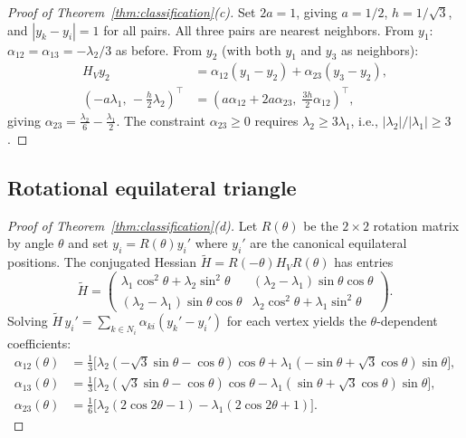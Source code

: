 \documentclass[11pt]{article}
\theoremstyle{plain}%
\theoremstyle{definition}%
\theoremstyle{definition}%
\theoremstyle{remark}%
\numberwithin{equation}{section}
\newcommand{\HV}{H_V}
\begin{document}
\begin{proof}[Proof of Theorem~\ref{thm:classification}(c)]
Set $2a=1$, giving $a=1/2$, $h=1/\sqrt{3}$, and $|y_k-y_i|=1$ for all pairs. All three pairs are nearest neighbors. From $y_1$: $\alpha_{12}=\alpha_{13}=-\lambda_2/3$ as before. From $y_2$ (with both $y_1$ and $y_3$ as neighbors):
\begin{align*}
\HV y_2 &= \alpha_{12}(y_1-y_2) + \alpha_{23}(y_3-y_2), \\
(-a\lambda_1,\,-\tfrac{h}{2}\lambda_2)^\intercal &= (a\alpha_{12}+2a\alpha_{23},\;\tfrac{3h}{2}\alpha_{12})^\intercal,
\end{align*}
giving $\alpha_{23}=\frac{\lambda_2}{6}-\frac{\lambda_1}{2}$. The constraint $\alpha_{23}\geq 0$ requires $\lambda_2\geq 3\lambda_1$, i.e., $|\lambda_2|/|\lambda_1|\geq 3$.
\end{proof}


\subsection{Rotational equilateral triangle}\label{subsec:rotational}

\begin{proof}[Proof of Theorem~\ref{thm:classification}(d)]
Let $R(\theta)$ be the $2\times 2$ rotation matrix by angle $\theta$ and set $y_i=R(\theta)y_i'$ where $y_i'$ are the canonical equilateral positions. The conjugated Hessian $\tilde{H}=R(-\theta)\HV R(\theta)$ has entries
\[
\tilde{H} = \begin{pmatrix} \lambda_1\cos^2\theta+\lambda_2\sin^2\theta & (\lambda_2-\lambda_1)\sin\theta\cos\theta \\ (\lambda_2-\lambda_1)\sin\theta\cos\theta & \lambda_2\cos^2\theta+\lambda_1\sin^2\theta \end{pmatrix}.
\]
Solving $\tilde{H}\,y_i' = \sum_{k\in N_i}\alpha_{ki}(y_k'-y_i')$ for each vertex yields the $\theta$-dependent coefficients:
\begin{align}
\alpha_{12}(\theta) &= \tfrac{1}{3}\bigl[\lambda_2(-\sqrt{3}\sin\theta-\cos\theta)\cos\theta + \lambda_1(-\sin\theta+\sqrt{3}\cos\theta)\sin\theta\bigr], \label{eq:alpha12} \\
\alpha_{13}(\theta) &= \tfrac{1}{3}\bigl[\lambda_2(\sqrt{3}\sin\theta-\cos\theta)\cos\theta - \lambda_1(\sin\theta+\sqrt{3}\cos\theta)\sin\theta\bigr], \label{eq:alpha13} \\
\alpha_{23}(\theta) &= \tfrac{1}{6}\bigl[\lambda_2(2\cos 2\theta-1) - \lambda_1(2\cos 2\theta+1)\bigr]. \label{eq:alpha23}
\end{align}
\end{proof}
\end{document}
